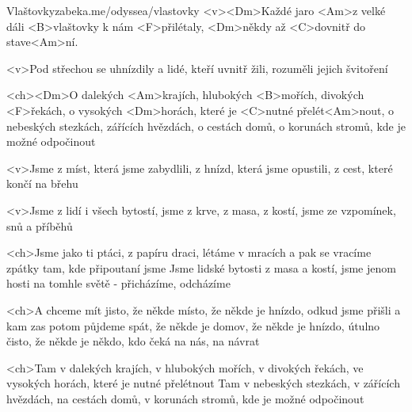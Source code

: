 \begin{song}[Traband]{19}{Vlaštovky}{zabeka.me/odyssea/vlastovky}
	<v><Dm>Každé jaro <Am>z velké dáli
	<B>vlaštovky k nám <F>přilétaly,
	<Dm>někdy až <C>dovnitř do stave<Am>ní.

	<v>Pod střechou se uhnízdily
	a lidé, kteří uvnitř žili,
	rozuměli jejich švitoření

	<ch><Dm>O dalekých <Am>krajích, hlubokých <B>mořích, divokých <F>řekách,
	o vysokých <Dm>horách, které je <C>nutné přelét<Am>nout,
	o nebeských stezkách, zářících hvězdách, o cestách domů,
	o korunách stromů, kde je možné odpočinout

	<v>Jsme z míst, která jsme zabydlili,
	z hnízd, která jsme opustili,
	z cest, které končí na břehu

	<v>Jsme z lidí i všech bytostí,
	jsme z krve, z masa, z kostí,
	jsme ze vzpomínek, snů a příběhů

	<ch>Jsme jako ti ptáci, z papíru draci, létáme v mracích
	a pak se vracíme zpátky tam, kde připoutaní jsme
	Jsme lidské bytosti z masa a kostí, jsme jenom hosti
	na tomhle světě - přicházíme, odcházíme

	<ch>A chceme mít jisto, že někde místo, že někde je hnízdo,
	odkud jsme přišli a kam zas potom půjdeme spát,
	že někde je domov, že někde je hnízdo, útulno čisto,
	že někde je někdo, kdo čeká na nás, na návrat

	<ch>Tam v dalekých krajích, v hlubokých mořích, v divokých řekách,
	ve vysokých horách, které je nutné přelétnout
	Tam v nebeských stezkách, v zářících hvězdách, na cestách domů,
	v korunách stromů, kde je možné odpočinout

\end{song}
